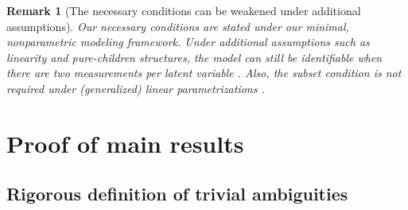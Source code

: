 \documentclass[10pt]{article} %
\newtheorem{remark}{Remark}
\begin{document}
\begin{remark}[The necessary conditions can be weakened under additional assumptions]
    Our necessary conditions are stated under our minimal, nonparametric modeling framework. Under additional assumptions such as linearity and pure-children structures, the model can still be identifiable when there are two measurements per latent variable \citep{xie2020generalized, gu2025blessing}. Also, the subset condition is not required under (generalized) linear parametrizations \citep[Theorem 2,][]{lee2025deep}.
\end{remark}


\section{Proof of main results}\label{sec:proof}
%
%
%
%

\subsection{Rigorous definition of trivial ambiguities}\label{sec:ambiguities}
\end{document}
